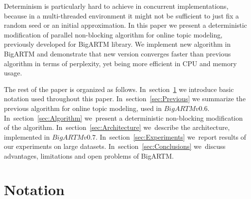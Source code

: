 \documentclass[russian,english]{llncs}
\begin{document}
Determinism is particularly hard to achieve
in concurrent implementations, because in a multi-threaded environment
it might not be sufficient to just fix a random seed or an initial approximation.
In this paper we present a deterministic modification of parallel non-blocking algorithm
for online topic modeling, previously developed for BigARTM library.
We implement new algorithm in BigARTM and demonstrate that new version converges faster
than previous algorithm in terms of perplexity,
yet being more efficient in CPU and memory usage.

The rest of the paper is organized as follows.
In~section~\ref{sec:Notation}
we introduce basic notation used throughout this paper.
In~section~\ref{sec:Previous}
we summarize the previous algorithm for online topic modeling, used in $BigARTM v0.6$.
In~section~\ref{sec:Algorithm}
we~present a deterministic non-blocking modification of the algorithm.
In~section~\ref{sec:Architecture}
we~describe the architecture, implemented in $BigARTM v0.7$.
In~section~\ref{sec:Experiments}
we~report results of our experiments on large datasets.
In~section~\ref{sec:Conclusions}
we~discuss advantages, limitations and open problems of BigARTM.


\section{Notation}
\label{sec:Notation}
\end{document}

